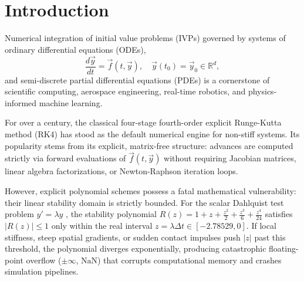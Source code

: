 \documentclass[11pt,a4paper]{article}
\theoremstyle{definition}
\begin{document}
\section{Introduction}

Numerical integration of initial value problems (IVPs) governed by systems of ordinary differential equations (ODEs),
\begin{equation}
    \frac{d\vec{y}}{dt} = \vec{f}(t, \vec{y}), \quad \vec{y}(t_0) = \vec{y}_0 \in \mathbb{R}^d,
    \label{eq:ivp}
\end{equation}
and semi-discrete partial differential equations (PDEs) is a cornerstone of scientific computing, aerospace engineering, real-time robotics, and physics-informed machine learning.

For over a century, the classical four-stage fourth-order explicit Runge-Kutta method (RK4) \cite{runge1895, kutta1901} has stood as the default numerical engine for non-stiff systems. Its popularity stems from its explicit, matrix-free structure: advances are computed strictly via forward evaluations of $\vec{f}(t, \vec{y})$ without requiring Jacobian matrices, linear algebra factorizations, or Newton-Raphson iteration loops.

However, explicit polynomial schemes possess a fatal mathematical vulnerability: their linear stability domain is strictly bounded. For the scalar Dahlquist test problem $y' = \lambda y$ \cite{dahlquist1952}, the stability polynomial $R(z) = 1 + z + \frac{z^2}{2} + \frac{z^3}{6} + \frac{z^4}{24}$ satisfies $|R(z)| \le 1$ only within the real interval $z = \lambda \Delta t \in [-2.78529, 0]$. If local stiffness, steep spatial gradients, or sudden contact impulses push $|z|$ past this threshold, the polynomial diverges exponentially, producing catastrophic floating-point overflow ($\pm\infty$, $\text{NaN}$) that corrupts computational memory and crashes simulation pipelines.
\end{document}
